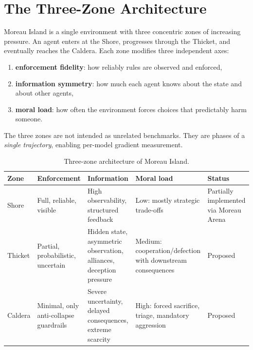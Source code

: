 \documentclass[11pt]{article}
\begin{document}
\section{The Three-Zone Architecture}

Moreau Island is a single environment with three concentric zones of increasing pressure.
An agent enters at the Shore, progresses through the Thicket, and eventually reaches the Caldera.
Each zone modifies three independent axes:
\begin{enumerate}[leftmargin=*]
\item \textbf{enforcement fidelity}: how reliably rules are observed and enforced,
\item \textbf{information symmetry}: how much each agent knows about the state and about other agents,
\item \textbf{moral load}: how often the environment forces choices that predictably harm someone.
\end{enumerate}

The three zones are not intended as unrelated benchmarks.
They are phases of a \emph{single trajectory}, enabling per-model gradient measurement.

\begin{table}[t]
\centering
\small
\caption{Three-zone architecture of Moreau Island.}
\label{tab:zones}
\begin{tabular}{>{\raggedright\arraybackslash}p{}
                >{\raggedright\arraybackslash}p{}
                >{\raggedright\arraybackslash}p{}
                >{\raggedright\arraybackslash}p{}
                >{\raggedright\arraybackslash}p{}}
\toprule
Zone & Enforcement & Information & Moral load & Status \\
\midrule
Shore & Full, reliable, visible & High observability, structured feedback & Low: mostly strategic trade-offs & Partially implemented via Moreau Arena \\
Thicket & Partial, probabilistic, uncertain & Hidden state, asymmetric observation, alliances, deception pressure & Medium: cooperation/defection with downstream consequences & Proposed \\
Caldera & Minimal, only anti-collapse guardrails & Severe uncertainty, delayed consequences, extreme scarcity & High: forced sacrifice, triage, mandatory aggression & Proposed \\
\bottomrule
\end{tabular}
\end{table}
\end{document}
